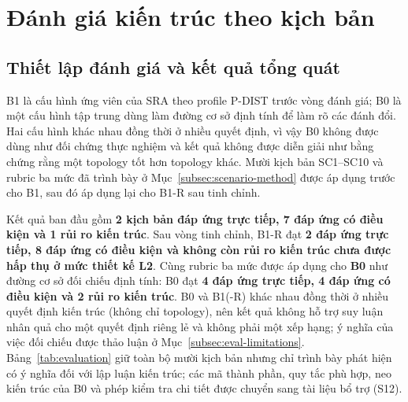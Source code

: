 \section{Đánh giá kiến trúc theo kịch bản}
\label{sec:evaluation}

\subsection{Thiết lập đánh giá và kết quả tổng quát}
\label{subsec:eval-baseline}

B1 là cấu hình ứng viên của SRA theo profile P-DIST trước vòng đánh giá; B0 là một cấu hình tập trung dùng làm đường cơ sở định tính để làm rõ các đánh đổi. Hai cấu hình khác nhau đồng thời ở nhiều quyết định, vì vậy B0 không được dùng như đối chứng thực nghiệm và kết quả không được diễn giải như bằng chứng rằng một topology tốt hơn topology khác. Mười kịch bản SC1--SC10 và rubric ba mức đã trình bày ở Mục~\ref{subsec:scenario-method} được áp dụng trước cho B1, sau đó áp dụng lại cho B1-R sau tinh chỉnh.

Kết quả ban đầu gồm \textbf{2 kịch bản đáp ứng trực tiếp, 7 đáp ứng có điều kiện và 1 rủi ro kiến trúc}. Sau vòng tinh chỉnh, B1-R đạt \textbf{2 đáp ứng trực tiếp, 8 đáp ứng có điều kiện và không còn rủi ro kiến trúc chưa được hấp thụ ở mức thiết kế L2}. Cùng rubric ba mức được áp dụng cho \textbf{B0} như đường cơ sở đối chiếu định tính: B0 đạt \textbf{4 đáp ứng trực tiếp, 4 đáp ứng có điều kiện và 2 rủi ro kiến trúc}. B0 và B1(-R) khác nhau đồng thời ở nhiều quyết định kiến trúc (không chỉ topology), nên kết quả không hỗ trợ suy luận nhân quả cho một quyết định riêng lẻ và không phải một xếp hạng; ý nghĩa của việc đối chiếu được thảo luận ở Mục~\ref{subsec:eval-limitations}. Bảng~\ref{tab:evaluation} giữ toàn bộ mười kịch bản nhưng chỉ trình bày phát hiện có ý nghĩa đối với lập luận kiến trúc; các mã thành phần, quy tắc phù hợp, neo kiến trúc của B0 và phép kiểm tra chi tiết được chuyển sang tài liệu bổ trợ (S12).

